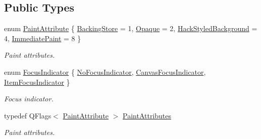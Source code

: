 \subsection*{Public Types}
\begin{DoxyCompactItemize}
\item 
enum \hyperlink{class_qwt_plot_canvas_a76066290edb594a71ee09be564563b0f}{Paint\-Attribute} \{ \hyperlink{class_qwt_plot_canvas_a76066290edb594a71ee09be564563b0fa7b88a46e1414f6d904aa494c89d064f3}{Backing\-Store} = 1, 
\hyperlink{class_qwt_plot_canvas_a76066290edb594a71ee09be564563b0fa1d10fbb2b1fc3323e8597597684b1f9f}{Opaque} = 2, 
\hyperlink{class_qwt_plot_canvas_a76066290edb594a71ee09be564563b0fa2a2fee2c1807f8306850e15977bacb70}{Hack\-Styled\-Background} = 4, 
\hyperlink{class_qwt_plot_canvas_a76066290edb594a71ee09be564563b0fa91fb95b7ec380cc5d517195c2ae6368f}{Immediate\-Paint} = 8
 \}
\begin{DoxyCompactList}\small\item\em Paint attributes. \end{DoxyCompactList}\item 
enum \hyperlink{class_qwt_plot_canvas_a89b44e4c28038a674ce211fe9ac2d7be}{Focus\-Indicator} \{ \hyperlink{class_qwt_plot_canvas_a89b44e4c28038a674ce211fe9ac2d7bea8578c1bdcba0a05d5d0b89aeb35a040d}{No\-Focus\-Indicator}, 
\hyperlink{class_qwt_plot_canvas_a89b44e4c28038a674ce211fe9ac2d7bea884899cc2fa5cb416e73fe3e7aba2271}{Canvas\-Focus\-Indicator}, 
\hyperlink{class_qwt_plot_canvas_a89b44e4c28038a674ce211fe9ac2d7bea5a56f0e29a38350abdcef18c3e583115}{Item\-Focus\-Indicator}
 \}
\begin{DoxyCompactList}\small\item\em Focus indicator. \end{DoxyCompactList}\item 
typedef Q\-Flags$<$ \hyperlink{class_qwt_plot_canvas_a76066290edb594a71ee09be564563b0f}{Paint\-Attribute} $>$ \hyperlink{class_qwt_plot_canvas_ac007a0126efb62443e52905d3157102d}{Paint\-Attributes}
\begin{DoxyCompactList}\small\item\em Paint attributes. \end{DoxyCompactList}\end{DoxyCompactItemize}
